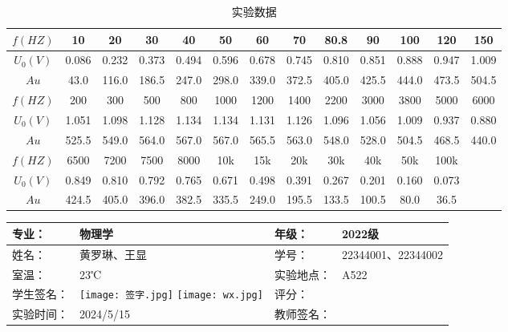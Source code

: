 \documentclass[dvipsnames, svgnames,a4paper,11pt]{article}
\begin{document}
		\begin{table}[h]
			\centering
			\caption{实验数据}
			\begin{tabular}{|c|*{12}{c|}}
				\hline
				$f(HZ)$ & 10 & 20 & 30 & 40 & 50 & 60 & 70 & 80.8 & 90 & 100 & 120 & 150 \\
				\hline
				$U_0(V)$ & 0.086 & 0.232 & 0.373 & 0.494 & 0.596 & 0.678 & 0.745 & 0.810 & 0.851 & 0.888 & 0.947 & 1.009 \\
				\hline
				$Au$ & 43.0 & 116.0 & 186.5 & 247.0 & 298.0 & 339.0 & 372.5 & 405.0 & 425.5 & 444.0 & 473.5 & 504.5 \\
				\hline
				$f(HZ)$ & 200 & 300 & 500 & 800 & 1000 & 1200 & 1400 & 2200 & 3000 & 3800 & 5000 & 6000 \\
				\hline
				$U_0(V)$ & 1.051 & 1.098 & 1.128 & 1.134 & 1.134 & 1.131 & 1.126 & 1.096 & 1.056 & 1.009 & 0.937 & 0.880 \\
				\hline
				$Au$ & 525.5 & 549.0 & 564.0 & 567.0 & 567.0 & 565.5 & 563.0 & 548.0 & 528.0 & 504.5 & 468.5 & 440.0 \\
				\hline
				$f(HZ)$ & 6500 & 7200 & 7500 & 8000 & 10k & 15k & 20k & 30k & 40k & 50k & 100k & \\
				\hline
				$U_0(V)$ & 0.849 & 0.810 & 0.792 & 0.765 & 0.671 & 0.498 & 0.391 & 0.267 & 0.201 & 0.160 & 0.073 & \\
				\hline
				$Au$ & 424.5 & 405.0 & 396.0 & 382.5 & 335.5 & 249.0 & 195.5 & 133.5 & 100.5 & 80.0 & 36.5 & \\
				\hline
			\end{tabular}
		\end{table}

	
	
	
	\clearpage
	\begin{table}
		\renewcommand\arraystretch{1.7}
		\centering
		\begin{tabularx}{\textwidth}{|X|X|X|X|}
			\hline
			专业： & 物理学 & 年级： & 2022级 \\
			\hline
			姓名： & 黄罗琳、王显 & 学号： &22344001、22344002 \\
			\hline
			室温： &23℃  & 实验地点： & A522 \\
			\hline
			学生签名：& \texttt{[image: 签字.jpg]} \texttt{[image: wx.jpg]} & 评分： &\\
			\hline
			实验时间：& 2024/5/15 & 教师签名：&\\
			\hline
		\end{tabularx}
	\end{table}
\end{document}

